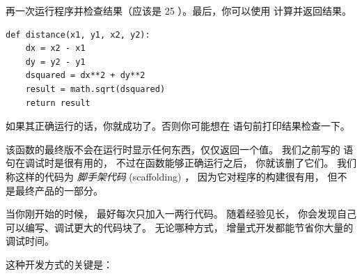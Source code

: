 %

再一次运行程序并检查结果（应该是 25 ）。最后，你可以使用  计算并返回结果。
  

\begin{lstlisting}
def distance(x1, y1, x2, y2):
    dx = x2 - x1
    dy = y2 - y1
    dsquared = dx**2 + dy**2
    result = math.sqrt(dsquared)
    return result
\end{lstlisting}

%

如果其正确运行的话，你就成功了。否则你可能想在  语句前打印结果检查一下。


该函数的最终版不会在运行时显示任何东西，仅仅返回一个值。
我们之前写的  语句在调试时是很有用的， 不过在函数能够正确运行之后， 你就该删了它们。
我们称这样的代码为 {\em 脚手架代码} (scaffolding) ， 因为它对程序的构建很有用， 但不是最终产品的一部分。


当你刚开始的时候， 最好每次只加入一两行代码。
随着经验见长， 你会发现自己可以编写、调试更大的代码块了。
无论哪种方式， 增量式开发都能节省你大量的调试时间。


这种开发方式的关键是：



